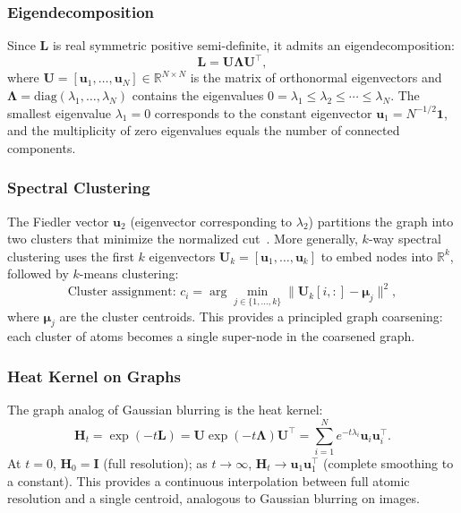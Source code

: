 \documentclass[12pt,a4paper]{article}
\providecommand{\R}{}
\renewcommand{\R}{\mathbb{R}}
\newcommand{\Lap}{\bm{L}}
\begin{document}
\subsubsection{Eigendecomposition}

Since $\Lap$ is real symmetric positive semi-definite, it admits an eigendecomposition:
\begin{equation}\label{eq:eigen}
    \Lap = \bm{U} \bm{\Lambda} \bm{U}^\top,
\end{equation}
where $\bm{U} = [\bm{u}_1, \ldots, \bm{u}_N] \in \R^{N \times N}$ is the matrix of orthonormal eigenvectors and $\bm{\Lambda} = \mathrm{diag}(\lambda_1, \ldots, \lambda_N)$ contains the eigenvalues $0 = \lambda_1 \leq \lambda_2 \leq \cdots \leq \lambda_N$. The smallest eigenvalue $\lambda_1 = 0$ corresponds to the constant eigenvector $\bm{u}_1 = N^{-1/2}\mathbf{1}$, and the multiplicity of zero eigenvalues equals the number of connected components.

\subsubsection{Spectral Clustering}

The Fiedler vector $\bm{u}_2$ (eigenvector corresponding to $\lambda_2$) partitions the graph into two clusters that minimize the normalized cut~\cite{vonluxburg2007spectral}. More generally, $k$-way spectral clustering uses the first $k$ eigenvectors $\bm{U}_k = [\bm{u}_1, \ldots, \bm{u}_k]$ to embed nodes into $\R^k$, followed by $k$-means clustering:
\begin{equation}\label{eq:spectral_clustering}
    \text{Cluster assignment: } c_i = \arg\min_{j \in \{1,\ldots,k\}} \|\bm{U}_k[i,:] - \bm{\mu}_j\|^2,
\end{equation}
where $\bm{\mu}_j$ are the cluster centroids. This provides a principled graph coarsening: each cluster of atoms becomes a single super-node in the coarsened graph.

\subsubsection{Heat Kernel on Graphs}

The graph analog of Gaussian blurring is the heat kernel:
\begin{equation}\label{eq:heat_kernel}
    \bm{H}_t = \exp(-t\Lap) = \bm{U} \exp(-t\bm{\Lambda}) \bm{U}^\top = \sum_{i=1}^N e^{-t\lambda_i} \bm{u}_i \bm{u}_i^\top.
\end{equation}
At $t = 0$, $\bm{H}_0 = \bm{I}$ (full resolution); as $t \to \infty$, $\bm{H}_t \to \bm{u}_1 \bm{u}_1^\top$ (complete smoothing to a constant). This provides a continuous interpolation between full atomic resolution and a single centroid, analogous to Gaussian blurring on images.
\end{document}
